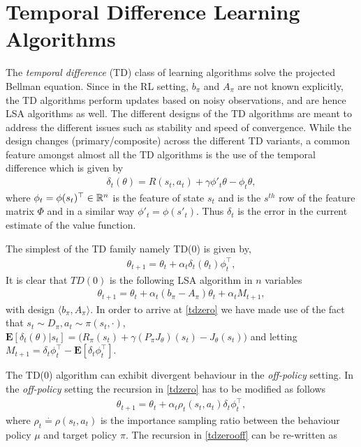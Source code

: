 \section{Temporal Difference Learning Algorithms}
The \emph{temporal difference} (TD) class of learning algorithms solve the projected Bellman equation. Since in the RL setting, $b_\pi$ and $A_\pi$ are not known explicitly, the TD algorithms perform updates based on noisy observations, and are hence LSA algorithms as well. The different designs of the TD algorithms are meant to address the different issues such as stability and speed of convergence.
While the design changes (primary/composite) across the different TD variants, a common feature amongst almost all the TD algorithms is the use of the temporal difference which is given by
\begin{align}\label{td}
\delta_t(\theta)=R(s_t,a_t)+\gamma \phi'_t\theta-\phi_t\theta,
\end{align}
where $\phi_t=\phi(s_t)^\top \in \mathbb{R}^n$ is the feature of state $s_t$ and is the $s^{th}$ row of the feature matrix $\Phi$ and in a similar way $\phi'_t=\phi(s'_t)$. Thus $\delta_t$ is the error in the current estimate of the value function.\par
The simplest of the TD family namely TD($0$) is given by,
\begin{align}\label{tdzero}
\theta_{t+1}=\theta_t+\alpha_t\delta_t(\theta_t)\phi_t^\top,
\end{align}
It is clear that $TD(0)$ is the following LSA algorithm in $n$ variables
\begin{align}\label{tdzero}
\theta_{t+1}=\theta_t+\alpha_t(b_\pi-A_\pi)\theta_t+\alpha_t M_{t+1},
\end{align} 
with design $\langle b_\pi,A_\pi \rangle$. In order to arrive at \eqref{tdzero} we have made use of the fact that $s_t\sim D_\pi, a_t\sim\pi(s_t,\cdot)$, $\mathbf{E}[\delta_t(\theta)|s_t]= \big(R_\pi(s_t)+\gamma (P_\pi J_\theta)(s_t) -J_\theta(s_t)\big)$ and letting $M_{t+1}=\delta_t\phi_t^\top-\mathbf{E}[\delta_t\phi_t^\top]$.\par
The TD($0$) algorithm can exhibit divergent behaviour in the \emph{off-policy} setting. In the \emph{off-policy} setting the recursion in \eqref{tdzero} has to be modified as follows
\begin{align}\label{tdzerooff}
\theta_{t+1}=\theta_t+\alpha_t\rho_t(s_t,a_t)\delta_t\phi_t^\top,
\end{align}
where $\rho_t\stackrel{\cdot}{=}\rho(s_t,a_t)$ is the importance sampling ratio between the behaviour policy $\mu$ and target policy $\pi$. The recursion in \eqref{tdzerooff} can be re-written as
